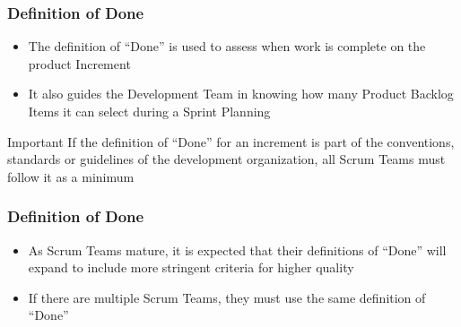 \begin{frame}
    \frametitle{Definition of Done}
    \begin{itemize}
        \setlength\itemsep{0.7em}
        \item The definition of “Done” is used to assess when work is complete on the product Increment
        \item It also guides the Development Team in knowing how many Product Backlog Items it can select during a Sprint Planning
    \end{itemize}
     {
        \vspace{1em}
        \begin{alertblock}{Important}
            If the definition of ``Done'' for an increment is part of the conventions, standards or guidelines of the development organization, all Scrum Teams must follow it as a minimum
        \end{alertblock}
    }
\end{frame}

\begin{frame}
    \frametitle{Definition of Done}
    \begin{itemize}
        \setlength\itemsep{0.7em}
        \item As Scrum Teams mature, it is expected that their definitions of ``Done'' will expand to include more stringent criteria for higher quality
        \item If there are multiple Scrum Teams, they must use the same definition of ``Done''
    \end{itemize}
\end{frame}
